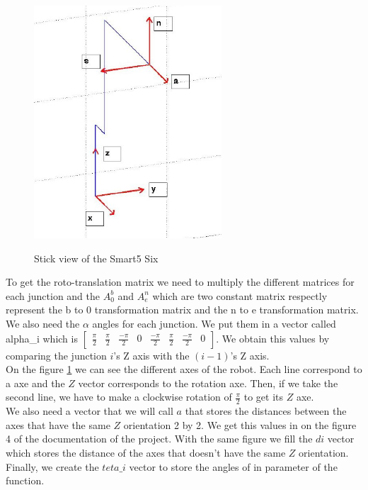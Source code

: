 \documentclass[english,a4paper,11pt]{report}
\begin{document}
	
	\begin{figure} 
		\vspace{-1cm}

 		 \begin{center}
  			\includegraphics[width=7cm]{images_not_compressed/alphaAngles.png}
			\label{alpha}
			\caption{Stick view of the Smart5 Six}
 		 \end{center}
	\end{figure} 
	
	\vspace{1cm}
	
	To get the roto-translation matrix we need to multiply the different matrices for each junction and the $A^{b}_{0}$ and $A^{n}_{e}$ which are two constant matrix respectly represent the b to 0 transformation matrix and the n to e transformation matrix.\\
	We also need the $\alpha$ angles for each junction. We put them in a vector called alpha\_i which is $\begin{bmatrix}\frac{\pi}{2} & \frac{\pi}{2} & \frac{-\pi}{2} & 0 & \frac{-\pi}{2} & \frac{\pi}{2} & \frac{-\pi}{2} & 0\end{bmatrix}$. We obtain this values by comparing the junction $i$\rq{}s Z axis with the $(i-1)$\rq{}s Z axis.\\
	On the figure \ref{alpha} we can see the different axes of the robot. Each line correspond to a axe and the $Z$ vector corresponds to the rotation axe. Then, if we take the second line, we have to make a clockwise rotation of $\frac{\pi}{2}$ to get its $Z$ axe.\\
	We also need a vector that we will call $a$ that stores the distances between the axes that have the same $Z$ orientation 2 by 2. We get this values in on the figure 4 of the documentation of the project. With the same figure we fill the $di$ vector which stores the distance of the axes that doesn\rq{}t have the same $Z$ orientation.
	Finally, we create the $teta\_i$ vector to store the angles of in parameter of the function.
\end{document}
